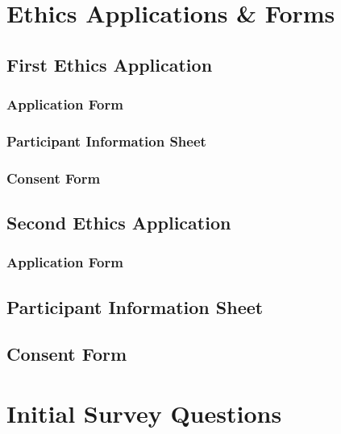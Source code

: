 
\chapter{Ethics Applications \& Forms}

\section{First Ethics Application}
\label{appx:ethics1}

\subsection{Application Form}


\subsection{Participant Information Sheet}


\subsection{Consent Form}


\section{Second Ethics Application}
\label{appx:ethics2}

\subsection{Application Form}


\section{Participant Information Sheet}


\section{Consent Form}





\chapter{Initial Survey Questions}
\label{appx:survey}




